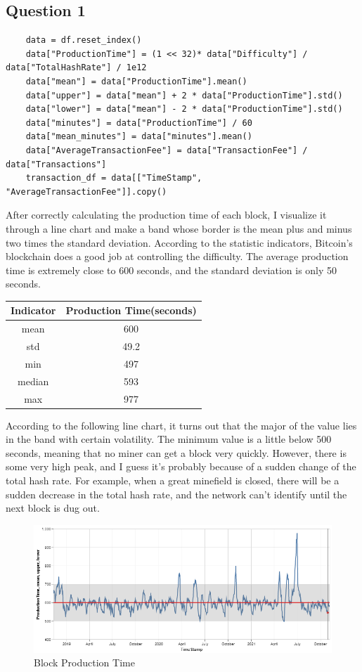 \documentclass[a4paper]{article}
\begin{document}
\subsection{Question 1}
\begin{verbatim}
    data = df.reset_index()
    data["ProductionTime"] = (1 << 32)* data["Difficulty"] / data["TotalHashRate"] / 1e12 
    data["mean"] = data["ProductionTime"].mean()
    data["upper"] = data["mean"] + 2 * data["ProductionTime"].std()
    data["lower"] = data["mean"] - 2 * data["ProductionTime"].std()
    data["minutes"] = data["ProductionTime"] / 60
    data["mean_minutes"] = data["minutes"].mean()
    data["AverageTransactionFee"] = data["TransactionFee"] / data["Transactions"]
    transaction_df = data[["TimeStamp", "AverageTransactionFee"]].copy()
\end{verbatim}
\par After correctly calculating the production time of each block, I visualize it through a line chart and make a band whose border is the mean plus and minus two times the standard deviation. According to the statistic indicators, Bitcoin's blockchain does a good job at controlling the difficulty. The average production time is extremely close to 600 seconds, and the standard deviation is only 50 seconds.
\begin{table}[H]
    \centering
    \begin{tabular}{@{}|c|c|@{}}
    \hline
    Indicator   & Production Time(seconds)  \\ \hline
    mean        & 600   \\ \hline
    std         & 49.2   \\ \hline
    min         & 497   \\ \hline
    median      & 593   \\ \hline
    max         & 977   \\ \hline
    \end{tabular}
\end{table}
According to the following line chart, it turns out that the major of the value lies in the band with certain volatility. The minimum value is a little below 500 seconds, meaning that no miner can get a block very quickly. However, there is some very high peak, and I guess it's probably because of a sudden change of the total hash rate. For example, when a great minefield is closed, there will be a sudden decrease in the total hash rate, and the network can't identify until the next block is dug out.
\begin{figure}[H]
    \centering
    \includegraphics[scale=0.5]{ProductionTime.png}
    \caption{Block Production Time}
\end{figure}
\end{document}
